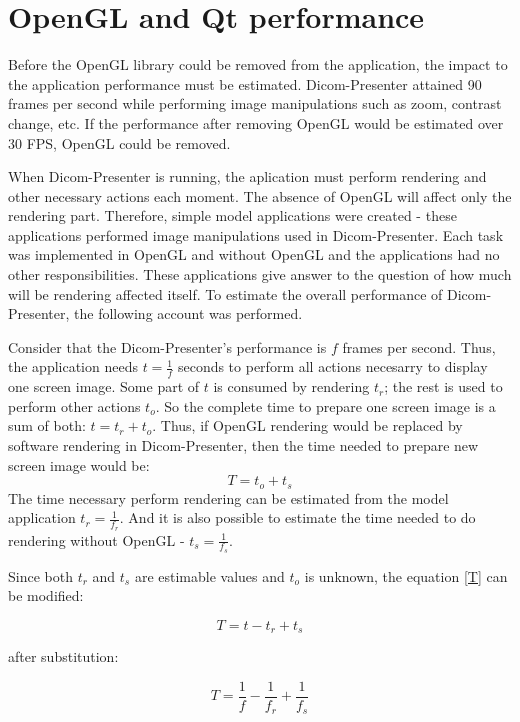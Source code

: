 \section{OpenGL and Qt performance}
Before the OpenGL library could be removed from the application, the impact to the application performance must be estimated. Dicom-Presenter attained 90 frames per second while performing image manipulations such as zoom, contrast change, etc. If the performance after removing OpenGL would be estimated over 30 FPS, OpenGL could be removed. 

When Dicom-Presenter is running, the aplication must perform rendering and other necessary actions each moment. The absence of OpenGL will affect only the rendering part. Therefore, simple model applications were created - these applications performed image manipulations used in Dicom-Presenter. Each task was implemented in OpenGL and without OpenGL and the applications had no other responsibilities. These applications give answer to the question of how much will be rendering affected itself. To estimate the overall performance of Dicom-Presenter, the following account was performed.
 
Consider that the Dicom-Presenter's performance is $f$ frames per second. Thus, the application needs $t=\frac{1}{f}$ seconds to perform all actions necesarry to display one screen image.  Some part of $t$ is consumed by rendering $t_{r}$; the rest is used to perform other actions $t_{o}$. So the complete time to prepare one screen image is a sum of both: $t=t_{r}+t_{o}$. Thus, if OpenGL rendering would be replaced by software rendering in Dicom-Presenter, then the time needed to prepare new screen image would be:
\begin{equation} \label{T}
T=t_{o} + t_{s}
\end{equation} 
The time necessary perform rendering can be estimated from the model application $t_{r} = \frac{1}{f_{r}}$. And it is also possible to estimate the time needed to do rendering without OpenGL - $t_{s} = \frac{1}{f_{s}}$.

Since both $t_{r}$ and $t_{s}$ are estimable values and $t_{o}$ is unknown, the equation \ref{T} can be modified:

\begin{equation} \label{T}
T = t - t_{r} + t_{s}
\end{equation} 

after substitution:

\begin{equation} \label{T}
T = \frac{1}{f} - \frac{1}{f_{r}} + \frac{1}{f_{s}}
\end{equation} 

